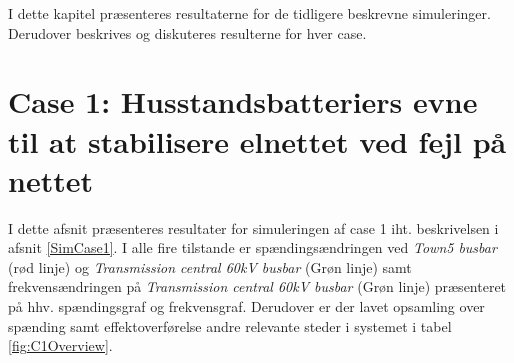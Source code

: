 
\label{ResultatOgDiskussion}

I dette kapitel præsenteres resultaterne for de tidligere beskrevne simuleringer. Derudover beskrives og diskuteres resulterne for hver case.\\
\section{Case 1: Husstandsbatteriers evne til at stabilisere elnettet ved fejl på nettet}
I dette afsnit præsenteres resultater for simuleringen af case 1 iht. beskrivelsen i afsnit \ref{SimCase1}. I alle fire tilstande er spændingsændringen ved \textit{Town5 busbar} (rød linje) og \textit{Transmission central 60kV busbar} (Grøn linje) samt frekvensændringen på \textit{Transmission central 60kV busbar} (Grøn linje) præsenteret på hhv. spændingsgraf og frekvensgraf. Derudover er der lavet opsamling over spænding samt effektoverførelse andre relevante steder i systemet i tabel \ref{fig:C1Overview}. \\ \\


